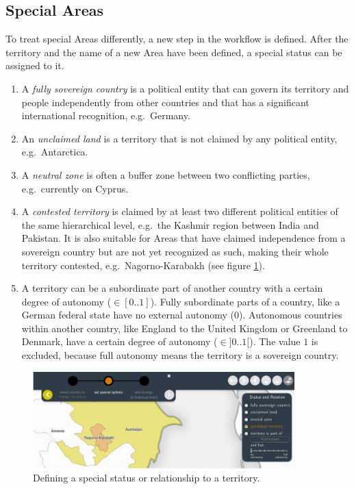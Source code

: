 
\subsection{Special Areas} %
\label{sub:special_areas}

To treat special Areas differently, a new step in the workflow is defined. After the territory and the name of a new Area have been defined, a special status can be assigned to it.

\begin{enumerate}
  \item A \emph{fully sovereign country} is a political entity
  that can govern its territory and people independently from other countries and that has a significant international recognition, e.g.\ Germany.
  \item An \emph{unclaimed land} is a territory that is not claimed by any political entity, e.g.\ Antarctica.
  \item A \emph{neutral zone} is often a buffer zone between two conflicting parties, e.g.\ currently on Cyprus.
  \item A \emph{contested territory} is claimed by at least two different political entities of the same hierarchical level, e.g.\ the Kashmir region between India and Pakistan. It is also suitable for Areas that have claimed independence from a sovereign country but are not yet recognized as such, making their whole territory contested, e.g.\ Nagorno-Karabakh (see figure \ref{fig:uncertainty_new_status_tool}).
  \item A territory can be a subordinate part of another country with a certain degree of autonomy ($\in [0..1]$). Fully subordinate parts of a country, like a German federal state have no external autonomy ($0$). Autonomous countries within another country, like England to the United Kingdom or Greenland to Denmark, have a certain degree of autonomy ($\in ]0..1[$). The value $1$ is excluded, because full autonomy means the territory is a sovereign country.
\end{enumerate}

\begin{figure}[ht]
  \centering
  \includegraphics[width = 0.9\textwidth]{graphics/extensions/new_status_tool}
  \caption{Defining a special status or relationship to a territory.}
  \label{fig:uncertainty_new_status_tool}
\end{figure}


